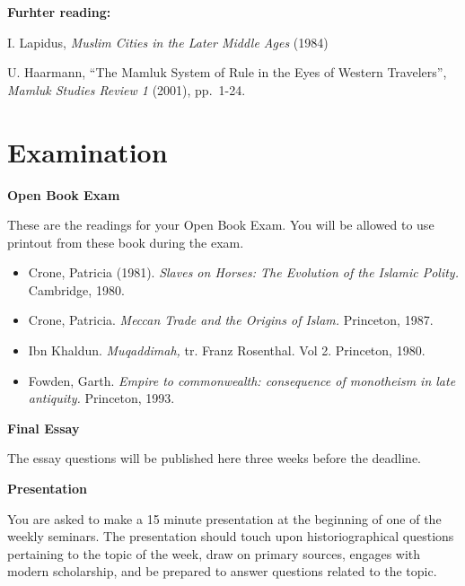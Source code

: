 \documentclass[
]{book}
\begin{document}
\textbf{Furhter reading:}

I. Lapidus, \emph{Muslim Cities in the Later Middle Ages} (1984)

U. Haarmann, ``The Mamluk System of Rule in the Eyes of Western Travelers'', \emph{Mamluk Studies Review 1} (2001), pp.~1-24.

\hypertarget{examination}{%
\chapter*{Examination}\label{examination}}

\textbf{Open Book Exam}

These are the readings for your Open Book Exam. You will be allowed to use printout from these book during the exam.

\begin{itemize}
\item
  Crone, Patricia (1981). \emph{Slaves on Horses: The Evolution of the Islamic Polity.} Cambridge, 1980.
\item
  Crone, Patricia. \emph{Meccan Trade and the Origins of Islam.} Princeton, 1987.
\item
  Ibn Khaldun. \emph{Muqaddimah,} tr. Franz Rosenthal. Vol 2. Princeton, 1980.
\item
  Fowden, Garth. \emph{Empire to commonwealth: consequence of monotheism in late antiquity.} Princeton, 1993.
\end{itemize}

\textbf{Final Essay}

The essay questions will be published here three weeks before the deadline.

\textbf{Presentation}

You are asked to make a 15 minute presentation at the beginning of one of the weekly seminars. The presentation should touch upon historiographical questions pertaining to the topic of the week, draw on primary sources, engages with modern scholarship, and be prepared to answer questions related to the topic.

  
\end{document}
